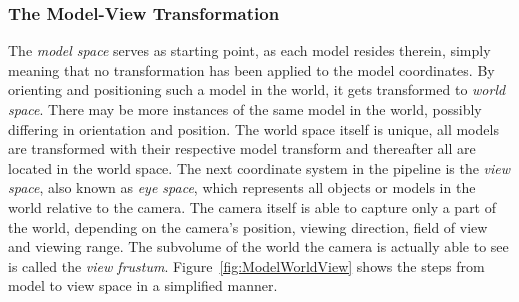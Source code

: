 \subsubsection{The Model-View Transformation}

The \textit{model space} serves as starting point, as each model resides
therein, simply meaning that no transformation has been applied to the model
coordinates. By orienting and positioning such a model in the world, it gets
transformed to \textit{world space}. There may be more instances of the same
model in the world, possibly differing in orientation and position. The world
space itself is unique, all models are transformed with their respective model
transform and thereafter all are located in the world space. The next
coordinate system in the pipeline is the \textit{view space}, also known as
\textit{eye space}, which represents all objects or models in the world relative
to the camera. The camera itself is able to capture only a part of the world,
depending on the camera's position, viewing direction, field of view and viewing
range. The subvolume of the world the camera is actually able to see is called
the \textit{view frustum}. Figure~\ref{fig:ModelWorldView} shows the
steps from model to view space in a simplified manner.

